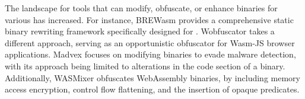 
 The landscape for tools that can modify, obfuscate, or enhance \Wasm binaries for various has increased. 
For instance, BREWasm\cite{BREWasm} provides a comprehensive static binary rewriting framework specifically designed for \Wasm. 
Wobfuscator\cite{wobfuscator} takes a different approach, serving as an opportunistic obfuscator for Wasm-JS browser applications. 
Madvex\cite{madvex} focuses on modifying \Wasm binaries to evade malware detection, with its approach being limited to alterations in the code section of a \Wasm binary. 
Additionally, WASMixer\cite{wasmixer} obfuscates WebAssembly binaries, by including memory access encryption, control flow flattening, and the insertion of opaque predicates.


